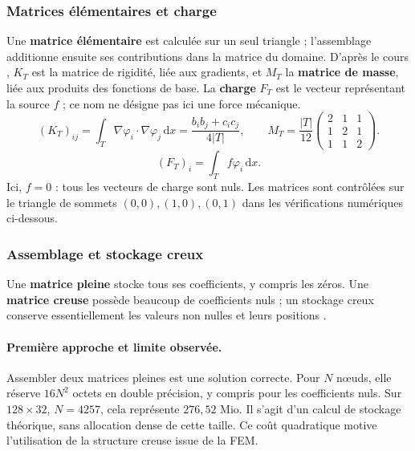 \documentclass[12pt,a4paper]{article}
\newcommand{\dd}{\,\mathrm{d}}
\begin{document}
\subsubsection{Matrices élémentaires et charge}
Une \textbf{matrice élémentaire} est calculée sur un seul triangle ; l'assemblage additionne ensuite ses contributions dans la matrice du domaine. D'après le cours \cite{fem}, $K_T$ est la matrice de rigidité, liée aux gradients, et $M_T$ la \textbf{matrice de masse}, liée aux produits des fonctions de base. La \textbf{charge} $F_T$ est le vecteur représentant la source $f$ ; ce nom ne désigne pas ici une force mécanique.
\begin{equation*}
(K_T)_{ij}=\int_T\nabla\varphi_i\cdot\nabla\varphi_j\dd x
=\frac{b_ib_j+c_ic_j}{4|T|},\qquad
M_T=\frac{|T|}{12}\begin{pmatrix}2&1&1\\1&2&1\\1&1&2\end{pmatrix}.
\end{equation*}
\begin{equation*}
(F_T)_i=\int_T f\varphi_i\dd x.
\end{equation*}
Ici, $f=0$ : tous les vecteurs de charge sont nuls. Les matrices sont contrôlées sur le triangle de sommets $(0,0),(1,0),(0,1)$ dans les vérifications numériques ci-dessous.

\subsubsection{Assemblage et stockage creux}
Une \textbf{matrice pleine} stocke tous ses coefficients, y compris les zéros. Une \textbf{matrice creuse} possède beaucoup de coefficients nuls ; un stockage creux conserve essentiellement les valeurs non nulles et leurs positions \cite{fem}.
\paragraph{Première approche et limite observée.}
Assembler deux matrices pleines est une solution correcte. Pour $N$ nœuds, elle réserve $16N^2$ octets en double précision, y compris pour les coefficients nuls. Sur $128\times32$, $N=4257$, cela représente $276,52$ Mio. Il s'agit d'un calcul de stockage théorique, sans allocation dense de cette taille. Ce coût quadratique motive l'utilisation de la structure creuse issue de la FEM.
\end{document}
